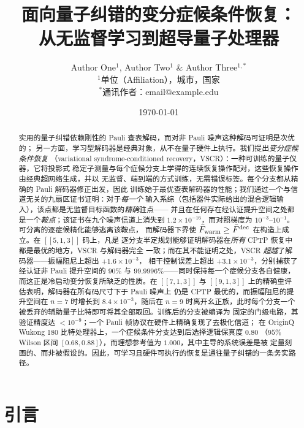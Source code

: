 \documentclass[11pt,a4paper]{article}
\title{\textbf{面向量子纠错的变分症候条件恢复：\\ 从无监督学习到超导量子处理器}}
\author{Author One$^{1}$, Author Two$^{1}$ \& Author Three$^{1,*}$\\
\small $^{1}$单位（Affiliation），城市，国家\\
\small $^{*}$通讯作者：email@example.edu}
\date{\today}
\newcommand{\code}{[\![5,1,3]\!]}
\begin{document}
\maketitle

\begin{abstract}
\noindent
实用的量子纠错依赖刚性的 Pauli 查表解码，而对非 Pauli 噪声这种解码可证明是次优的；
另一方面，学习型解码器是经典对象，从不在量子硬件上执行。我们提出\emph{变分症候条件恢复}
（variational syndrome-conditioned recovery，VSCR）：一种可训练的量子仪器，它将投影式
稳定子测量与每个症候分支上学得的连续恢复操作配对，这些恢复操作由经典超网络生成，并以
无监督、端到端的方式训练，无需错误标签。每个分支都从精确的 Pauli 解码器修正出发，因此
训练始于最优查表解码器的性能；我们通过一个与信道无关的九扇区证书证明：对于\emph{每一个}
输入系综（包括器件实际给出的混合逻辑输入），该点都是无监督目标函数的\emph{精确}驻点——
并且在任何存在经认证提升空间之处都是一个\emph{鞍点}；该证书在九个噪声信道上消失到
$1.2\times10^{-16}$，而对照梯度为 $10^{-3}$--$10^{-1}$。可分离的逐症候精化能够逃离该鞍点，
而解码器下界使 $\bar F_{\rm warm}\ge\bar F^{\rm dec}$ 在构造上成立。在 $\code$ 码上，凡是
逐分支半定规划能够证明解码器在\emph{所有} CPTP 恢复中都是最优的地方，VSCR 与解码器完全
一致；而在其不能证明之处，VSCR \emph{超越}了解码器——振幅阻尼上超出 $+1.6\times10^{-3}$，
相干控制误差上超出 $+3.1\times10^{-3}$，分别捕获了经认证非 Pauli 提升空间的 $90\%$ 与
$99.9996\%$——同时保持每一个症候分支各自健康，而这正是冷启动变分恢复所缺乏的性质。在
$[\![7,1,3]\!]$ 与 $[\![9,1,3]\!]$ 上的精确重评估表明，解码器在所有码尺寸下于 Pauli 噪声上
仍是 CPTP 最优的，而振幅阻尼的提升空间在 $n=7$ 时增长到 $8.4\times10^{-3}$，随后在 $n=9$
时离开幺正族，此时每个分支一个被丢弃的辅助量子比特即可将其全部取回。训练后的分支被编译为
固定的门级电路，其验证精度达 $<10^{-9}$；一个 Pauli 帧协议在硬件上精确复现了去极化信道；
在 OriginQ Wukong 180 比特处理器上，一个症候条件分支达到后选择逻辑保真度 $0.80$
（$95\%$ Wilson 区间 $[0.68,0.88]$），而理想参考值为 $1.000$，其中主导的系统误差是被
定量刻画的、而非被假设的。因此，可学习且硬件可执行的恢复是通往量子纠错的一条务实路径。
\end{abstract}

\section*{引言}
\end{document}

